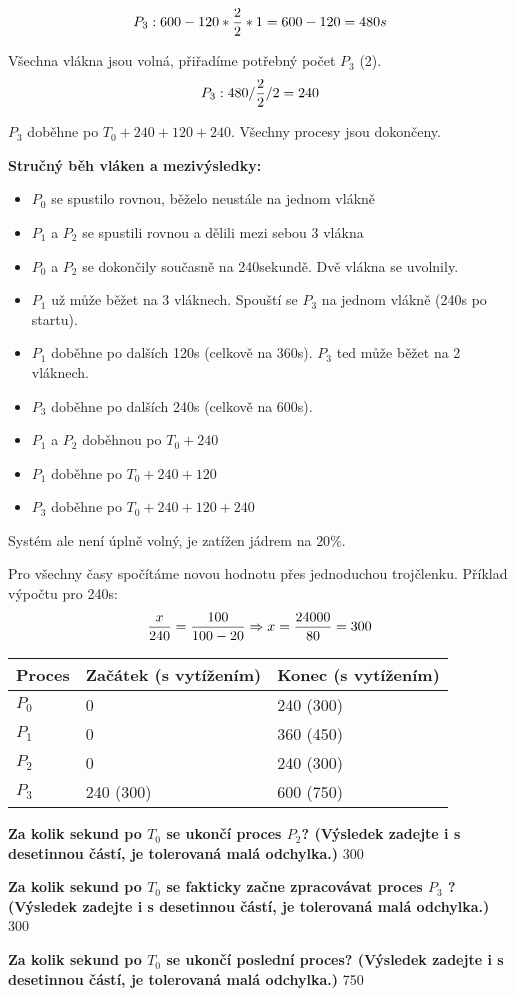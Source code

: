 $$P_3: 600 - 120*{2 \over 2}*1 = 600 - 120 = 480s$$

Všechna vlákna jsou volná, přiřadíme potřebný počet $P_3$ (2).
$$P_3: 480/{2 \over 2}/2 = 240$$

$P_3$ doběhne po $T_0 + 240 + 120 + 240$. Všechny procesy jsou dokončeny.

\textbf{Stručný běh vláken a mezivýsledky:}

\begin{itemize}
    \item $P_0$ se spustilo rovnou, běželo neustále na jednom vlákně
    \item $P_1$ a $P_2$ se spustili rovnou a dělili mezi sebou 3 vlákna
    \item $P_0$ a $P_2$ se dokončily současně na 240sekundě. Dvě vlákna se uvolnily.
    \item $P_1$ už může běžet na 3 vláknech. Spouští se $P_3$ na jednom vlákně (240s po startu).
    \item $P_1$ doběhne po dalších 120s (celkově na 360s). $P_3$ ted může běžet na 2 vláknech.
    \item $P_3$ doběhne po dalších 240s (celkově na 600s).
\end{itemize}

\begin{itemize}
    \item $P_1$ a $P_2$ doběhnou po $T_0 + 240$
    \item $P_1$ doběhne po $T_0 + 240 + 120$
    \item $P_3$ doběhne po $T_0 + 240 + 120 + 240$
\end{itemize}

Systém ale není úplně volný, je zatížen jádrem na $20\%$.

Pro všechny časy spočítáme novou hodnotu přes jednoduchou trojčlenku. Příklad výpočtu pro 240s:
$${x \over 240} = {100 \over {100 - 20}} \Rightarrow x = {24000 \over 80} = 300$$


\begin{table}[h]
    \centering
    \begin{tabular}{ l|l|l }
        \hline
        Proces & Začátek (s vytížením) & Konec (s vytížením)\\
        \hline
        $P_0$ & 0 & 240 (300)\\
        $P_1$ & 0 & 360 (450)\\
        $P_2$ & 0 & 240 (300)\\
        $P_3$ & 240 (300) & 600 (750)\\
        \hline
    \end{tabular}
\end{table}

\textbf{Za kolik sekund po $T_0$ se ukončí proces $P_2$? (Výsledek zadejte i s desetinnou částí, je tolerovaná malá odchylka.)} 300

\textbf{Za kolik sekund po $T_0$ se fakticky začne zpracovávat proces $P_3$ ? (Výsledek zadejte i s desetinnou částí, je tolerovaná malá odchylka.)} 300

\textbf{Za kolik sekund po $T_0$ se ukončí poslední proces? (Výsledek zadejte i s desetinnou částí, je tolerovaná malá odchylka.)} 750
\pagebreak